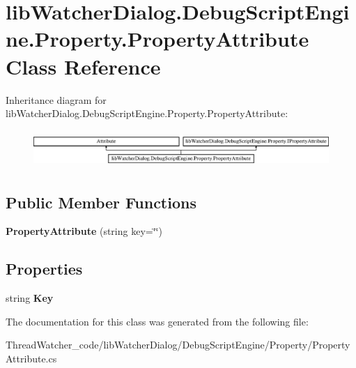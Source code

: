 \hypertarget{classlib_watcher_dialog_1_1_debug_script_engine_1_1_property_1_1_property_attribute}{\section{lib\+Watcher\+Dialog.\+Debug\+Script\+Engine.\+Property.\+Property\+Attribute Class Reference}
\label{classlib_watcher_dialog_1_1_debug_script_engine_1_1_property_1_1_property_attribute}
}
Inheritance diagram for lib\+Watcher\+Dialog.\+Debug\+Script\+Engine.\+Property.\+Property\+Attribute\+:\begin{figure}[H]
\begin{center}
\leavevmode
\includegraphics[height=1.454545cm]{classlib_watcher_dialog_1_1_debug_script_engine_1_1_property_1_1_property_attribute}
\end{center}
\end{figure}
\subsection*{Public Member Functions}
\begin{DoxyCompactItemize}
\item 
\hypertarget{classlib_watcher_dialog_1_1_debug_script_engine_1_1_property_1_1_property_attribute_af4c1321c62a4347187c0a8a8668f7388}{{\bfseries Property\+Attribute} (string key=\char`\"{}\char`\"{})}\label{classlib_watcher_dialog_1_1_debug_script_engine_1_1_property_1_1_property_attribute_af4c1321c62a4347187c0a8a8668f7388}

\end{DoxyCompactItemize}
\subsection*{Properties}
\begin{DoxyCompactItemize}
\item 
\hypertarget{classlib_watcher_dialog_1_1_debug_script_engine_1_1_property_1_1_property_attribute_a820f6903abec1a77837cc3ff94876dd6}{string {\bfseries Key}}\label{classlib_watcher_dialog_1_1_debug_script_engine_1_1_property_1_1_property_attribute_a820f6903abec1a77837cc3ff94876dd6}

\end{DoxyCompactItemize}


The documentation for this class was generated from the following file\+:\begin{DoxyCompactItemize}
\item 
Thread\+Watcher\+\_\+code/lib\+Watcher\+Dialog/\+Debug\+Script\+Engine/\+Property/Property\+Attribute.\+cs\end{DoxyCompactItemize}
